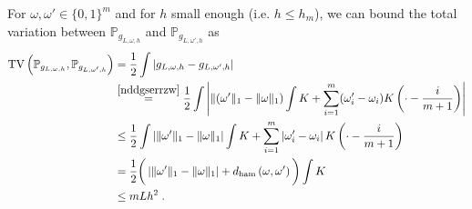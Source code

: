 \documentclass[10pt]{article} %
\newcommand{\Prob}[0]{\mathbb{P}}
\newcommand\tv[2]{\mathrm{TV}\left( {#1}, {#2} \right)}
\newcommand\ham[2]{d_\mathrm{ham}\left( {#1}, {#2} \right)}
\newcommand\p[1]{\left( {#1}\right)}
\begin{document}
For $\omega, \omega' \in \{0, 1\}^m $ and for $h$ small enough (i.e. $h \leq h_m$), we can bound the total variation between $\Prob_{g_{L, \omega, h}}$ and $\Prob_{g_{L, \omega', h}}$ as 
\begin{align}
    \tv{\Prob_{g_{L, \omega, h}}}{\Prob_{g_{L, \omega', h}}} 
    &=
    \frac{1}{2} \int \left| g_{L, \omega, h} - g_{L, \omega', h} \right| \notag\\
    &\stackrel{\eqref{nddgserrzw}}{=}
    \frac{1}{2} \int \left| \| (\omega' \|_1 - \| \omega \|_1) \int K + \sum_{i=1}^m (\omega_i' - \omega_i) K\p{\cdot - \frac{i}{m+1}}\right| \notag\\
    &\leq
    \frac{1}{2} \int \left| \| \omega' \|_1 - \| \omega \|_1\right| \int K + \sum_{i=1}^m \left|\omega_i' - \omega_i\right| K\p{\cdot - \frac{i}{m+1}} \notag \\
    &=
    \frac{1}{2} \bigg( \left| \| \omega' \|_1 - \| \omega \|_1\right|  + \ham{\omega}{\omega'}\bigg) \int K \label{eq:tvsawham}\\
    &\leq mLh^2\;.\label{eq:tvsaw}\
\end{align}
\end{document}

